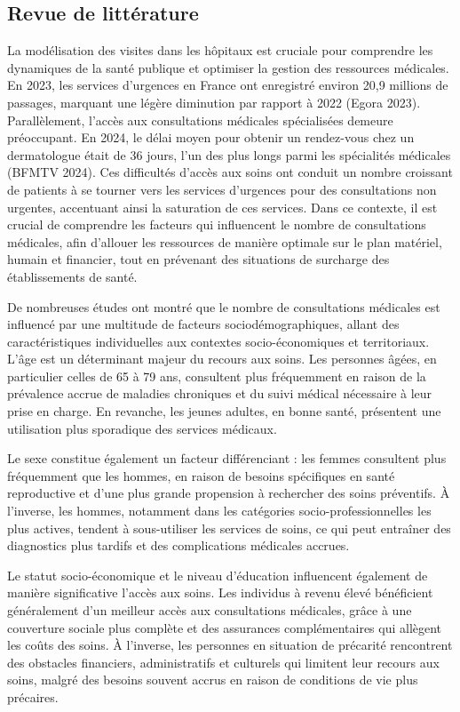 \documentclass[
]{article}
\begin{document}
\subsection{Revue de littérature}\label{revue-de-littuxe9rature}

La modélisation des visites dans les hôpitaux est cruciale pour
comprendre les dynamiques de la santé publique et optimiser la gestion
des ressources médicales. En 2023, les services d'urgences en France ont
enregistré environ 20,9 millions de passages, marquant une légère
diminution par rapport à 2022 (Egora 2023). Parallèlement, l'accès aux
consultations médicales spécialisées demeure préoccupant. En 2024, le
délai moyen pour obtenir un rendez-vous chez un dermatologue était de 36
jours, l'un des plus longs parmi les spécialités médicales (BFMTV 2024).
Ces difficultés d'accès aux soins ont conduit un nombre croissant de
patients à se tourner vers les services d'urgences pour des
consultations non urgentes, accentuant ainsi la saturation de ces
services. Dans ce contexte, il est crucial de comprendre les facteurs
qui influencent le nombre de consultations médicales, afin d'allouer les
ressources de manière optimale sur le plan matériel, humain et
financier, tout en prévenant des situations de surcharge des
établissements de santé.

De nombreuses études ont montré que le nombre de consultations médicales
est influencé par une multitude de facteurs sociodémographiques, allant
des caractéristiques individuelles aux contextes socio-économiques et
territoriaux. L'âge est un déterminant majeur du recours aux soins. Les
personnes âgées, en particulier celles de 65 à 79 ans, consultent plus
fréquemment en raison de la prévalence accrue de maladies chroniques et
du suivi médical nécessaire à leur prise en charge. En revanche, les
jeunes adultes, en bonne santé, présentent une utilisation plus
sporadique des services médicaux.

Le sexe constitue également un facteur différenciant : les femmes
consultent plus fréquemment que les hommes, en raison de besoins
spécifiques en santé reproductive et d'une plus grande propension à
rechercher des soins préventifs. À l'inverse, les hommes, notamment dans
les catégories socio-professionnelles les plus actives, tendent à
sous-utiliser les services de soins, ce qui peut entraîner des
diagnostics plus tardifs et des complications médicales accrues.

Le statut socio-économique et le niveau d'éducation influencent
également de manière significative l'accès aux soins. Les individus à
revenu élevé bénéficient généralement d'un meilleur accès aux
consultations médicales, grâce à une couverture sociale plus complète et
des assurances complémentaires qui allègent les coûts des soins. À
l'inverse, les personnes en situation de précarité rencontrent des
obstacles financiers, administratifs et culturels qui limitent leur
recours aux soins, malgré des besoins souvent accrus en raison de
conditions de vie plus précaires.
\end{document}
